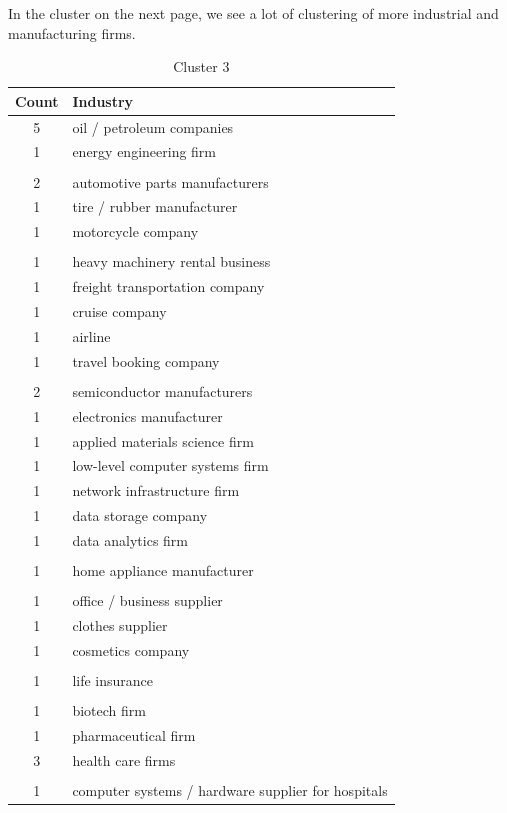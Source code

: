 \documentclass[final]{article}
\begin{document}
In the cluster on the next page, we see a lot of clustering of more
industrial and manufacturing firms.
\begin{table}[H]
\centering
\caption{Cluster 3}
\label{c3}
\begin{tabular}{@{}cl@{}}
  \toprule
  Count & Industry \\ \midrule
  5 & oil / petroleum companies \\
  1 & energy engineering firm \\
    & \\
  2 & automotive parts manufacturers \\
  1 & tire / rubber manufacturer \\
  1 & motorcycle company \\
    & \\
  1 & heavy machinery rental business \\
  1 & freight transportation company \\
  1 & cruise company \\
  1 & airline \\
  1 & travel booking company \\
    & \\
  2 & semiconductor manufacturers \\
  1 & electronics manufacturer \\
  1 & applied materials science firm \\
  1 & low-level computer systems firm \\
  1 & network infrastructure firm \\
  1 & data storage company \\
  1 & data analytics firm  \\
    & \\
  1 & home appliance manufacturer \\
  & \\
  1 & office / business supplier \\
  1 & clothes supplier \\
  1 & cosmetics company \\
  & \\
  1 & life insurance \\
  & \\
  1 & biotech firm \\
  1 & pharmaceutical firm \\
  3 & health care firms \\
  & \\
  1 & computer systems / hardware supplier for hospitals \\

\end{tabular}
\end{table}
\end{document}
